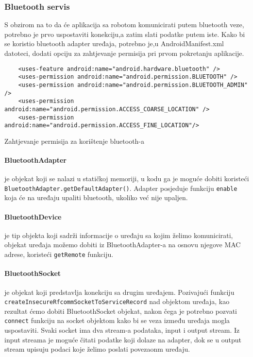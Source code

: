 \documentclass[../Document.tex]{subfiles}
\begin{document}
\subsubsection{Bluetooth servis}
S obzirom na to da će aplikacija sa robotom komunicirati putem bluetooth veze, potrebno je prvo uspostaviti konekciju,a zatim slati podatke putem iste. Kako bi se koristio bluetooth adapter uređaja, potrebno je,u AndroidManifest.xml datoteci, dodati opciju za zahtjevanje permisija pri prvom pokretanju aplikacije.

\begin{code}
    \begin{verbatim}
    <uses-feature android:name="android.hardware.bluetooth" />
    <uses-permission android:name="android.permission.BLUETOOTH" />
    <uses-permission android:name="android.permission.BLUETOOTH_ADMIN" />
    <uses-permission android:name="android.permission.ACCESS_COARSE_LOCATION" />
    <uses-permission android:name="android.permission.ACCESS_FINE_LOCATION"/>
    \end{verbatim}
    \caption{Zahtjevanje permisija za korištenje bluetooth-a}
\end{code}

\paragraph{BluetoothAdapter} je objekat koji se nalazi u statičkoj memoriji, u kodu ga je moguće dobiti koristeći \verb|BluetoothAdapter.getDefaultAdapter()|. Adapter posjeduje funkciju \verb|enable| koja će na uređaju upaliti bluetooth, ukoliko već nije upaljen.

\paragraph{BluetoothDevice} \label{btdev}je tip objekta koji sadrži informacije o uređaju sa kojim želimo komunicirati, objekat uređaja možemo dobiti iz BluetoothAdapter-a na osnovu njegove MAC adrese, koristeći \verb|getRemote| funkciju.

\paragraph{BluetoothSocket} je objekat koji predstavlja konekciju sa drugim uređajem. Pozivajući funkciju \verb|createInsecureRfcommSocketToServiceRecord| nad objektom uređaja, kao rezultat ćemo dobiti BluetoothSocket objekat, nakon čega je potrebno pozvati \verb|connect| funkciju na socket objektom kako bi se veza između uređaja mogla uspostaviti. Svaki socket ima dva stream-a podataka, input i output stream. Iz input streama je moguće čitati podatke koji dolaze na adapter, dok se u output stream upisuju podaci koje želimo poslati povezaonm uređaju.
\end{document}

